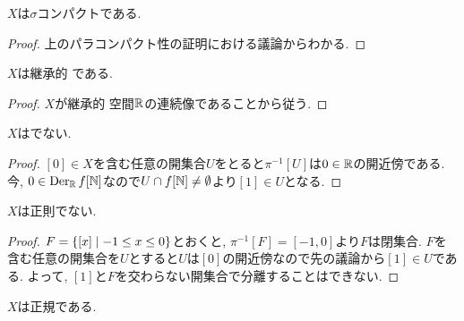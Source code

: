 \documentclass[uplatex, dvipdfmx, a4paper, 12pt, class=jsbook, crop=false]{standalone}
\begin{document}
\begin{property}
	$ X $は$\sigma$コンパクトである.
\end{property}

\begin{proof}
	上のパラコンパクト性の証明における議論からわかる.
\end{proof}

\begin{property}
	$ X $は継承的 \Lindelof である.
\end{property}

\begin{proof}
	$ X $が継承的 \Lindelof 空間$ \mathbb{R} $の連続像であることから従う.
\end{proof}

\begin{property}
	$ X $はでない.
\end{property}

\begin{proof}
	$[0] \in X$を含む任意の開集合$ U $をとると$ \pi^{-1}[U] $は$0 \in \mathbb{R}$の開近傍である. 今, $0 \in \mathop{\mathrm{Der}}\nolimits_{\mathbb{R}} f[\mathbb{N}]$なので$U \cap f[\mathbb{N}] \neq \emptyset$より$[1] \in U$となる.
\end{proof}

\begin{property}
	$ X $は正則でない.
\end{property}

\begin{proof}
    $ F = \setcomp{[x]}{-1 \leq x \leq 0}$とおくと, $\pi^{-1}[F] = [-1, 0]$より$ F $は閉集合. $　F　$を含む任意の開集合を$ U $とすると$ U $は$ [0] $の開近傍なので先の議論から$ [1] \in U$である. よって, $[1]$と$ F $を交わらない開集合で分離することはできない.
\end{proof}

\begin{property}
	$ X $は正規である.
\end{property}
\end{document}
